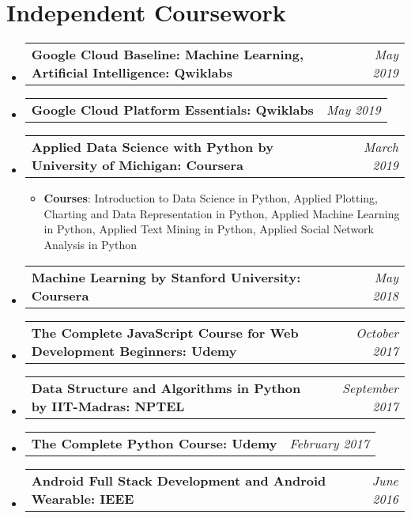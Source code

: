 \documentclass[letterpaper,11pt]{article}
\makeatletter
\newcommand{\resumeItem}[2]{
  \item\small{
    \textbf{#1}{: #2 \vspace{-2pt}}
  }
}
\newcommand{\resumeSubheading}[4]{
  \vspace{-1pt}\item
    \begin{tabular*}{0.97\textwidth}[t]{l@{\extracolsep{\fill}}r}
      \textbf{#1} & #2 \\
      \textit{\small#3} & \textit{\small #4} \\
    \end{tabular*}\vspace{-5pt}
}
\newcommand{\resumeSubheadingtwo}[2]{
  \vspace{-1pt}\item
    \begin{tabular*}{0.97\textwidth}[t]{l@{\extracolsep{\fill}}r}
      \textbf{#1} & \textit{\small #2} \\
    \end{tabular*}\vspace{-5pt}
}
\newcommand{\resumeSubHeadingListStart}{\begin{itemize}[leftmargin=*]}
\newcommand{\resumeSubHeadingListEnd}{\end{itemize}}
\newcommand{\resumeItemListStart}{\begin{itemize}}
\newcommand{\resumeItemListEnd}{\end{itemize}\vspace{-5pt}}
\makeatother
\begin{document}

\section{Independent Coursework}
  \resumeSubHeadingListStart

    \resumeSubheadingtwo
      {Google Cloud Baseline: Machine Learning, Artificial Intelligence: Qwiklabs}{May 2019}


    \resumeSubheadingtwo
      {Google Cloud Platform Essentials: Qwiklabs}{May 2019}

      
      \resumeSubheadingtwo
      {Applied Data Science with Python by University of Michigan: Coursera}{March 2019}
      \resumeItemListStart
        \resumeItem{Courses}
          {Introduction to Data Science in Python, Applied Plotting, Charting and Data Representation in Python, Applied Machine Learning in Python, Applied Text Mining in Python, Applied Social Network Analysis in Python}
      \resumeItemListEnd
    
    \resumeSubheadingtwo
      {Machine Learning by Stanford University: Coursera}{May 2018}
    
    \resumeSubheadingtwo
      {The Complete JavaScript Course for Web Development Beginners: Udemy}{October 2017}
    
    \resumeSubheadingtwo
      {Data Structure and Algorithms in Python by IIT-Madras: NPTEL}{September 2017}
    
    \resumeSubheadingtwo
      {The Complete Python Course: Udemy}{February 2017}
    
    \resumeSubheadingtwo
      {Android Full Stack Development and Android Wearable: IEEE}{June 2016}

  \resumeSubHeadingListEnd



\end{document}
